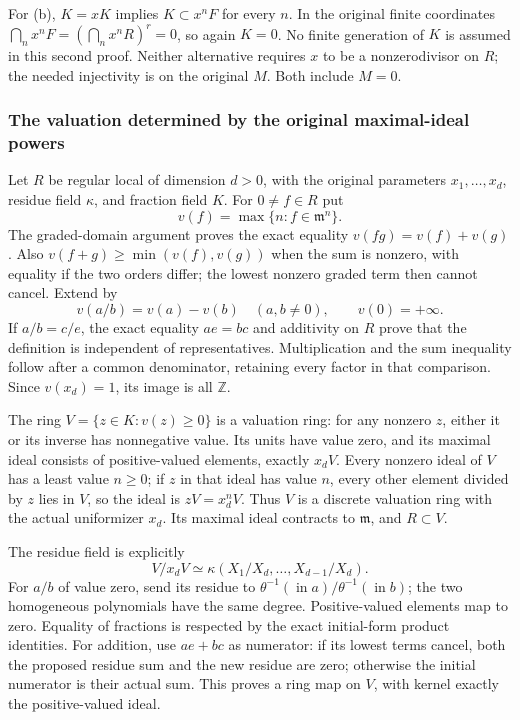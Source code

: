 For (b), \(K=xK\) implies \(K\subset x^nF\) for every \(n\). In the original finite coordinates \(\bigcap_n x^nF=(\bigcap_n x^nR)^r=0\), so again \(K=0\). No finite generation of \(K\) is assumed in this second proof. Neither alternative requires \(x\) to be a nonzerodivisor on \(R\); the needed injectivity is on the original \(M\). Both include \(M=0\).

\subsubsection{The valuation determined by the original maximal-ideal powers}\label{the-valuation-determined-by-the-original-maximal-ideal-powers}

Let \(R\) be regular local of dimension \(d>0\), with the original parameters \(x_1,\ldots,x_d\), residue field \(\kappa\), and fraction field \(K\). For \(0\ne f\in R\) put \[
 v(f)=\max\{n:f\in\mathfrak m^n\}.
\] The graded-domain argument proves the exact equality \(v(fg)=v(f)+v(g)\). Also \(v(f+g)\ge\min(v(f),v(g))\) when the sum is nonzero, with equality if the two orders differ; the lowest nonzero graded term then cannot cancel. Extend by \[
 v(a/b)=v(a)-v(b)\quad(a,b\ne0),\qquad v(0)=+\infty.
\] If \(a/b=c/e\), the exact equality \(ae=bc\) and additivity on \(R\) prove that the definition is independent of representatives. Multiplication and the sum inequality follow after a common denominator, retaining every factor in that comparison. Since \(v(x_d)=1\), its image is all \(\mathbb Z\).

The ring \(V=\{z\in K:v(z)\ge0\}\) is a valuation ring: for any nonzero \(z\), either it or its inverse has nonnegative value. Its units have value zero, and its maximal ideal consists of positive-valued elements, exactly \(x_dV\). Every nonzero ideal of \(V\) has a least value \(n\ge0\); if \(z\) in that ideal has value \(n\), every other element divided by \(z\) lies in \(V\), so the ideal is \(zV=x_d^nV\). Thus \(V\) is a discrete valuation ring with the actual uniformizer \(x_d\). Its maximal ideal contracts to \(\mathfrak m\), and \(R\subset V\).

The residue field is explicitly \[
 V/x_dV\simeq
 \kappa(X_1/X_d,\ldots,X_{d-1}/X_d).
\] For \(a/b\) of value zero, send its residue to \(\theta^{-1}(\operatorname{in}a)/\theta^{-1}(\operatorname{in}b)\); the two homogeneous polynomials have the same degree. Positive-valued elements map to zero. Equality of fractions is respected by the exact initial-form product identities. For addition, use \(ae+bc\) as numerator: if its lowest terms cancel, both the proposed residue sum and the new residue are zero; otherwise the initial numerator is their actual sum. This proves a ring map on \(V\), with kernel exactly the positive-valued ideal.

